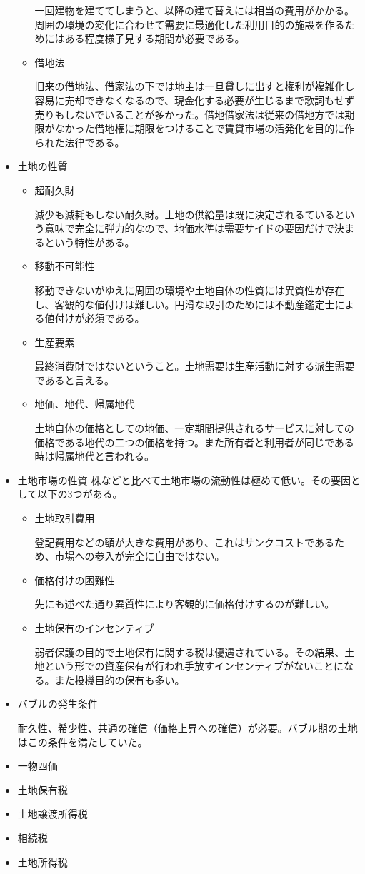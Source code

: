 \documentclass{jsarticle}
\begin{document}
\begin{itemize}
\begin{itemize}
	一回建物を建ててしまうと、以降の建て替えには相当の費用がかかる。周囲の環境の変化に合わせて需要に最適化した利用目的の施設を作るためにはある程度様子見する期間が必要である。
	\item 借地法
	
	旧来の借地法、借家法の下では地主は一旦貸しに出すと権利が複雑化し容易に売却できなくなるので、現金化する必要が生じるまで歌詞もせず売りもしないでいることが多かった。借地借家法は従来の借地方では期限がなかった借地権に期限をつけることで賃貸市場の活発化を目的に作られた法律である。
	\end{itemize}
\item 土地の性質
	\begin{itemize}
	\item 超耐久財
	
	減少も減耗もしない耐久財。土地の供給量は既に決定されるているという意味で完全に弾力的なので、地価水準は需要サイドの要因だけで決まるという特性がある。
	\item 移動不可能性
	
	移動できないがゆえに周囲の環境や土地自体の性質には異質性が存在し、客観的な値付けは難しい。円滑な取引のためには不動産鑑定士による値付けが必須である。
	\item 生産要素
	
	最終消費財ではないということ。土地需要は生産活動に対する派生需要であると言える。
	\item 地価、地代、帰属地代
	
	土地自体の価格としての地価、一定期間提供されるサービスに対しての価格である地代の二つの価格を持つ。また所有者と利用者が同じである時は帰属地代と言われる。
	\end{itemize}
\item 土地市場の性質
株などと比べて土地市場の流動性は極めて低い。その要因として以下の3つがある。
	\begin{itemize}
	\item 土地取引費用
	
	登記費用などの額が大きな費用があり、これはサンクコストであるため、市場への参入が完全に自由ではない。
	\item 価格付けの困難性
	
	先にも述べた通り異質性により客観的に価格付けするのが難しい。
	\item 土地保有のインセンティブ
	
	弱者保護の目的で土地保有に関する税は優遇されている。その結果、土地という形での資産保有が行われ手放すインセンティブがないことになる。また投機目的の保有も多い。
	\end{itemize}
\item バブルの発生条件

耐久性、希少性、共通の確信（価格上昇への確信）が必要。バブル期の土地はこの条件を満たしていた。
\item 一物四価


\item 土地保有税
\item 土地譲渡所得税
\item 相続税
\item 土地所得税
\end{itemize}
\end{document}
